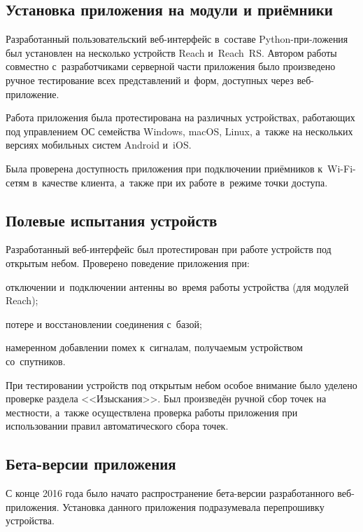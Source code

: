 
\subsection{Установка приложения на модули и приёмники}

Разработанный пользовательский веб-интерфейс в~составе Python-при-ложения был установлен на несколько устройств Reach и~Reach~RS. Автором работы совместно с~разработчиками серверной части приложения было произведено ручное тестирование всех представлений и~форм, доступных через веб-приложение.

Работа приложения была протестирована на различных устройствах, работающих под управлением ОС семейства Windows, macOS, Linux, а~также на нескольких версиях мобильных систем Android и~iOS.

Была проверена доступность приложения при подключении приёмников к~Wi-Fi-сетям в~качестве клиента, а~также при их работе в~режиме точки доступа.



\subsection{Полевые испытания устройств}

Разработанный веб-интерфейс был протестирован при работе устройств под открытым небом. Проверено поведение приложения при:
\begin{dashitemize}
  \item отключении и~подключении антенны во~время работы устройства (для модулей Reach);
  \item потере и восстановлении соединения с~базой;
  \item намеренном добавлении помех к~сигналам, получаемым устройством со~спутников.
\end{dashitemize}

При тестировании устройств под открытым небом особое внимание было уделено проверке раздела <<Изыскания>>. Был произведён ручной сбор точек на местности, а~также осуществлена проверка работы приложения при использовании правил автоматического сбора точек.



\subsection{Бета-версии приложения}

С конце 2016 года было начато распространение бета-версии разработанного веб-приложения. Установка данного приложения подразумевала перепрошивку устройства.

